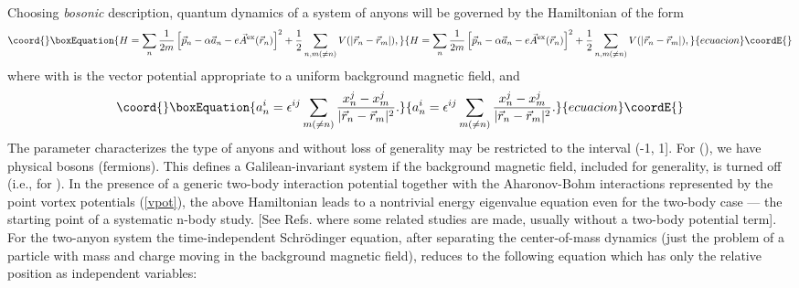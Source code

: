 \documentclass[a4paper,aps,eqsecnum,preprint,preprintnumbers,12pt]{revtex4}
\begin{document}
Choosing {\it bosonic} description, quantum dynamics of a system
of anyons will be governed by the Hamiltonian of the form
\cite{khare, lerda}
\begin{equation}\coord{}\boxEquation{
H = \sum_{n} \frac{1}{2m} \left[ \vec{p}_{n} - \alpha \vec{a}_{n}
- e \vec{A}^{\rm ex}(\vec{r}_{n}) \right]^{2} + \frac{1}{2}
\sum_{n,m(\neq n)} V(|\vec{r}_{n}-\vec{r}_{m}|),
}{
H = \sum_{n} \frac{1}{2m} \left[ \vec{p}_{n} - \alpha \vec{a}_{n}
- e \vec{A}^{\rm ex}(\vec{r}_{n}) \right]^{2} + \frac{1}{2}
\sum_{n,m(\neq n)} V(|\vec{r}_{n}-\vec{r}_{m}|),
}{ecuacion}\coordE{}\end{equation}
where \coordHE{} with
\coordHE{} is the vector potential appropriate to a uniform background
magnetic field, and
\begin{equation}\coord{}\boxEquation{ \label{vpot}
a^{i}_{n} = \epsilon^{ij} \sum_{m(\neq n)}
\frac{x^{j}_{n}-x^{j}_{m}}{|\vec{r}_{n}-\vec{r}_{m}|^{2}}.
}{ a^{i}_{n} = \epsilon^{ij} \sum_{m(\neq n)}
\frac{x^{j}_{n}-x^{j}_{m}}{|\vec{r}_{n}-\vec{r}_{m}|^{2}}.
}{ecuacion}\coordE{}\end{equation}
The parameter \myHighlight{$\alpha$}\coordHE{} characterizes the type of anyons and
without loss of generality \myHighlight{$\alpha$}\coordHE{} may be restricted to the
interval (-1, 1]. For \coordHE{} (\coordHE{}), we have physical
bosons (fermions). This defines a Galilean-invariant system if the
background magnetic field, included for generality, is turned off
(i.e., for \coordHE{}). In the presence of a generic two-body
interaction potential \coordHE{} together with
the Aharonov-Bohm interactions represented by the point vortex
potentials (\ref{vpot}), the above Hamiltonian leads to a
nontrivial energy eigenvalue equation even for the two-body case
--- the starting point of a systematic n-body study. [See Refs.
\cite{khare, lerda, johnson, wu, dunne} where some related studies
are made, usually without a two-body potential term]. For the
two-anyon system the time-independent Schr\"{o}dinger equation,
after separating the center-of-mass dynamics (just the problem of
a particle with mass \coordHE{} and charge \coordHE{} moving in the
background magnetic field), reduces to the following equation
which has only the relative position \coordHE{} as independent variables:
\end{document}

